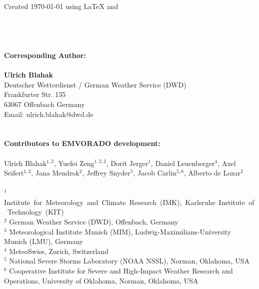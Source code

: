 \documentclass[10pt,a4paper,twoside,headinclude,footinclude,parskip=half]{scrartcl}
\begin{document}
\begin{minipage}{\linewidth}
Created \today\xspace using \LaTeX\xspace and \KOMAScript \\\\\\\\\\
\textbf{\Large Corresponding Author:}\\\\
\textbf{Ulrich Blahak}\\
Deutscher Wetterdienst / German Weather Service (DWD)\\
Frankfurter Str. 135\\
63067 Offenbach
Germany\\[0.5em]
Email: ulrich.blahak@dwd.de \\\\\\

\textbf{\Large Contributors to EMVORADO development:}\\\\
Ulrich Blahak$^{1,2}$, Yuefei Zeng$^{1,2,3}$, Dorit Jerger$^{1}$, Daniel Leuenberger$^{4}$, Axel Seifert$^{1,2}$, Jana Mendrok$^{2}$, Jeffrey Snyder$^{5}$, Jacob Carlin$^{5,6}$, Alberto de Lozar$^{2}$\\\\
$^{1}$ \mbox{Institute for Meteorology and Climate Research (IMK), Karlsruhe Institute of Technology (KIT)}\\
$^{2}$ German Weather Service (DWD), Offenbach, Germany\\
$^{3}$ Meteorological Institute Munich (MIM), Ludwig-Maximilians-University Munich (LMU), Germany\\
$^{4}$ MeteoSwiss, Zurich, Switzerland\\
$^{5}$ National Severe Storms Laboratory (NOAA NSSL), Norman, Oklahoma, USA\\
$^{6}$ Cooperative Institute for Severe and High-Impact Weather Research and Operations, University of Oklahoma, Norman, Oklahoma, USA\\\\\\


\end{minipage}
\end{document}
